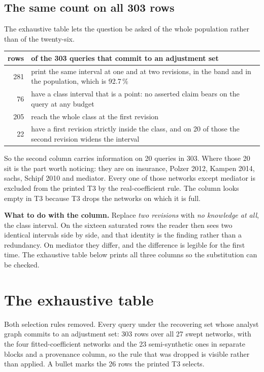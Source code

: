 \subsection{The same count on all 303 rows}

The exhaustive table lets the question be asked of the whole population rather than of the
twenty-six.

\begin{center}\small
\begin{tabular}{@{}rp{12.6cm}@{}}
\toprule
rows & of the 303 queries that commit to an adjustment set \\
\midrule
281 & print the same interval at one and at two revisions, in the band and in the population,
which is 92.7\,\% \\
76 & have a class interval that is a point: no asserted claim bears on the query at any budget \\
205 & reach the whole class at the first revision \\
22 & have a first revision strictly inside the class, and on 20 of those the second revision
widens the interval \\
\bottomrule
\end{tabular}
\end{center}

So the second column carries information on 20 queries in 303. Where those 20 sit is the part worth
noticing: they are on insurance, Polzer 2012, Kampen 2014, sachs, Schipf 2010 and mediator. Every
one of those networks except mediator is excluded from the printed T3 by the real-coefficient rule.
The column looks empty in T3 because T3 drops the networks on which it is full.

\begin{verdict}
\textbf{What to do with the column.} Replace \emph{two revisions} with \emph{no knowledge at all},
the class interval. On the sixteen saturated rows the reader then sees two identical intervals side
by side, and that identity is the finding rather than a redundancy. On mediator they differ,
and the difference is legible for the first time. The exhaustive table below prints all three
columns so the substitution can be checked.
\end{verdict}

\clearpage
\section{The exhaustive table}

Both selection rules removed. Every query under the recovering set whose analyst graph commits to an
adjustment set: 303 rows over all 27 swept networks, with the four fitted-coefficient networks and
the 23 semi-synthetic ones in separate blocks and a provenance column, so the rule that was dropped
is visible rather than applied. A bullet marks the 26 rows the printed T3 selects.

